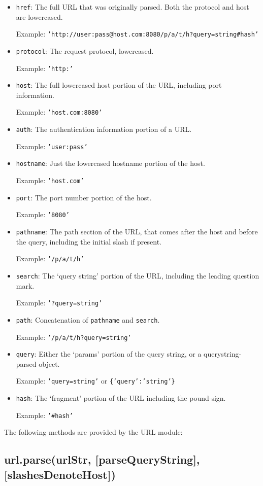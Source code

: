 \begin{itemize}
\item
  \texttt{href}: The full URL that was originally parsed. Both the
  protocol and host are lowercased.

  Example:
  \texttt{'http://user:pass@host.com:8080/p/a/t/h?query=string\#hash'}
\item
  \texttt{protocol}: The request protocol, lowercased.

  Example: \texttt{'http:'}
\item
  \texttt{host}: The full lowercased host portion of the URL, including
  port information.

  Example: \texttt{'host.com:8080'}
\item
  \texttt{auth}: The authentication information portion of a URL.

  Example: \texttt{'user:pass'}
\item
  \texttt{hostname}: Just the lowercased hostname portion of the host.

  Example: \texttt{'host.com'}
\item
  \texttt{port}: The port number portion of the host.

  Example: \texttt{'8080'}
\item
  \texttt{pathname}: The path section of the URL, that comes after the
  host and before the query, including the initial slash if present.

  Example: \texttt{'/p/a/t/h'}
\item
  \texttt{search}: The `query string' portion of the URL, including the
  leading question mark.

  Example: \texttt{'?query=string'}
\item
  \texttt{path}: Concatenation of \texttt{pathname} and \texttt{search}.

  Example: \texttt{'/p/a/t/h?query=string'}
\item
  \texttt{query}: Either the `params' portion of the query string, or a
  querystring-parsed object.

  Example: \texttt{'query=string'} or \texttt{\{'query':'string'\}}
\item
  \texttt{hash}: The `fragment' portion of the URL including the
  pound-sign.

  Example: \texttt{'\#hash'}
\end{itemize}

The following methods are provided by the URL module:

\subsection{url.parse(urlStr, {[}parseQueryString{]},
{[}slashesDenoteHost{]})}

